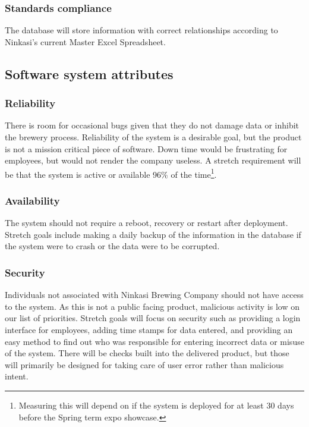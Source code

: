 \documentclass[draftclsnofoot,onecolumn,letterpaper,10pt,compsoc]{IEEEtran}
\begin{document}
		\subsubsection{Standards compliance}

		The database will store information with correct relationships according to Ninkasi's current Master Excel Spreadsheet.

	\subsection{Software system attributes}
		\subsubsection{Reliability}

		There is room for occasional bugs given that they do not damage data or inhibit the brewery process.
		Reliability of the system is a desirable goal, but the product is not a mission critical piece of software.
		Down time would be frustrating for employees, but would not render the company useless.
        A stretch requirement will be that the system is active or available 96\% of the time\footnote{Measuring this will depend on if the system is deployed for at least 30 days before the Spring term expo showcase.}.

		\subsubsection{Availability}

		The system should not require a reboot, recovery or restart after deployment.
		Stretch goals include making a daily backup of the information in the database if the system were to crash or the data were to be corrupted.

		\subsubsection{Security}

		Individuals not associated with Ninkasi Brewing Company should not have access to the system.
		As this is not a public facing product, malicious activity is low on our list of priorities.
		Stretch goals will focus on security such as providing a login interface for employees, adding time stamps for data entered, and providing an easy method to find out who was responsible for entering incorrect data or misuse of the system.
		There will be checks built into the delivered product, but those will primarily be designed for taking care of user error rather than malicious intent.
\end{document}

